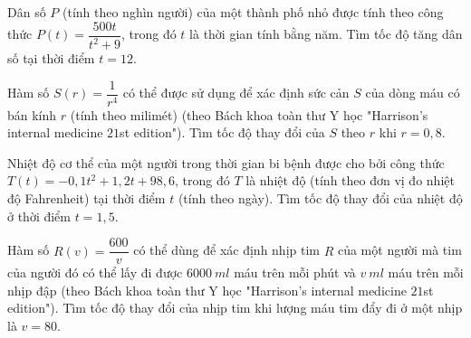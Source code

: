 \begin{bt}%
	Dân số $P$ (tính theo nghìn người) của một thành phố nhỏ được tính theo công thức $P(t)=\dfrac{500t}{t^2+9}$, trong đó $t$ là thời gian tính bằng năm. Tìm tốc độ tăng dân số tại thời điểm $t=12$.
\end{bt}

\begin{bt}%
	Hàm số $S(r)=\dfrac{1}{r^4}$ có thể được sử dụng để xác định sức cản $S$ của dòng máu có bán kính $r$ (tính theo milimét) (theo Bách khoa toàn thư Y học "Harrison's internal medicine  $21$st edition"). Tìm tốc độ thay đổi của $S$ theo $r$ khi $r=0{,}8$.
\end{bt}

\begin{bt}%
	Nhiệt độ cơ thể của một người trong thời gian bi bệnh được cho bởi công thức $T(t)=-0{,}1t^2+1{,}2t+98{,}6$, trong đó $T$ là nhiệt độ (tính theo đơn vị đo nhiệt độ Fahrenheit) tại thời điểm $t$ (tính theo ngày). Tìm tốc độ thay đổi của nhiệt độ ở thời điểm $t=1{,}5$.
\end{bt}

\begin{bt}%
	Hàm số $R(v)=\dfrac{600}{v}$ có thể dùng để xác định nhịp tim $R$ của một người mà tim của người đó có thể lấy đi được $6000~ml$ máu trên mỗi phút và $v~ml$ máu trên mỗi nhịp đập (theo Bách khoa toàn thư Y học "Harrison's internal medicine  $21$st edition"). Tìm tốc độ thay đổi của nhịp tim khi lượng máu tim đẩy đi ở một nhịp là $v=80$.
\end{bt}
